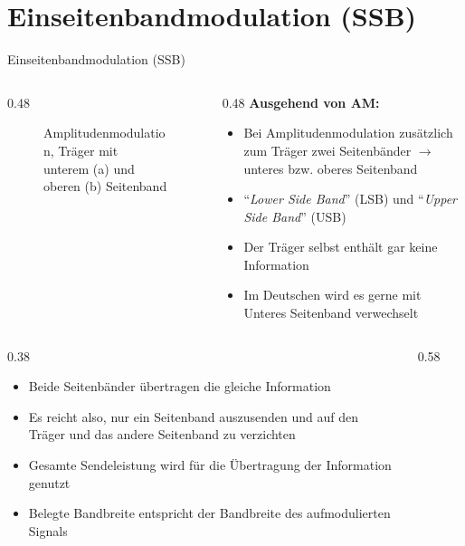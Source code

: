\section{Einseitenbandmodulation (SSB)}
\label{section:ssb}
\begin{frame}{Einseitenbandmodulation (SSB)}
    \begin{columns}
        \begin{column}{0.48\textwidth}
            \begin{figure}
                \caption{\scriptsize Amplitudenmodulation, Träger mit unterem (a) und oberen (b) Seitenband}
                \label{n_seitenband}
            \end{figure}
        \end{column}
        \begin{column}{0.48\textwidth}
            \textbf{Ausgehend von AM:}
            \begin{itemize}
                \item Bei Amplitudenmodulation zusätzlich zum Träger zwei Seitenbänder $\rightarrow$ unteres bzw. oberes Seitenband
                \item \enquote{\textit{Lower Side Band}} (LSB) und \enquote{\textit{Upper Side Band}} (USB)
                \item Der Träger selbst enthält gar keine Information
                \item Im Deutschen wird es gerne mit Unteres Seitenband verwechselt
            \end{itemize}
        \end{column}
    \end{columns}
\end{frame}

\begin{frame}
    \begin{columns}
        \begin{column}{0.38\textwidth}
            \begin{itemize}
                \item Beide Seitenbänder übertragen die gleiche Information
                \item Es reicht also, nur ein Seitenband auszusenden und auf den Träger und das andere Seitenband zu verzichten
                \item Gesamte Sendeleistung wird für die Übertragung der Information genutzt
                \item Belegte Bandbreite entspricht der Bandbreite des aufmodulierten Signals
            \end{itemize}
        \end{column}
        \begin{column}{0.58\textwidth}
            \begin{figure}
            \end{figure}
        \end{column}
    \end{columns}
\end{frame}

